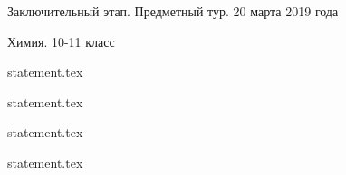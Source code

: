 \documentclass[a4paper,11pt, oneside]{book}
\begin{document}
\vspace{-3mm}
\vspace{-5mm}
\vspace{-5mm}

\normalsize

\begin{center}
    Заключительный этап. Предметный тур. 20 марта 2019 года
    
    Химия. 10-11 класс
\end{center}

\parindent=0cm

{statement.tex}

{statement.tex}

{statement.tex}

\clearpage

{statement.tex}
\end{document}
